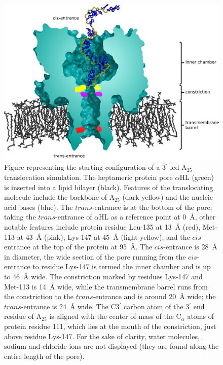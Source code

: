 \documentclass[a4paper,10pt]{article}
\newcommand{\atf}{A$_{25}$ }
\newcommand{\ahl}{$\alpha$HL }
\newcommand{\prim}{$^{\prime}$ }
\begin{document}
\begin{figure}[!h]
  \begin{center}
    \includegraphics[width=5.0in]{ahl_labelled13}
  \end{center}
  \caption{Figure representing the starting configuration of a 3\prim
led \atf translocation simulation. The heptameric protein pore \ahl
(green) is inserted into a lipid bilayer (black). Features of the
translocating molecule include the backbone of \atf (dark yellow) and
the nucleic acid bases (blue). The $trans$-entrance is at the bottom
of the pore; taking the $trans$-entrance of \ahl as a reference point
at 0~{\AA}, other notable features include protein residue Leu-135 at
13~{\AA} (red), Met-113 at 43~{\AA} (pink), Lys-147 at 45~{\AA} (light
yellow), and the $cis$-entrance at the top of the protein at
95~{\AA}. The $cis$-entrance is 28~{\AA} in diameter, the wide section
of the pore running from the $cis$-entrance to residue Lys-147 is
termed the inner chamber and is up to 46~{\AA} wide. The constriction
marked by residues Lys-147 and Met-113 is 14~{\AA} wide, while the
transmembrane barrel runs from the constriction to the
$trans$-entrance and is around 20~{\AA} wide; the $trans$-entrance is
24~{\AA} wide. The C3\prim carbon atom of the 3\prim end residue of
\atf is aligned with the center of mass of the C$_{\alpha}$ atoms of
protein residue 111, which lies at the mouth of the constriction, just
above residue Lys-147. For the sake of clarity, water molecules,
sodium and chloride ions are not displayed (they are found along the
entire length of the pore).}
  \label{fig:edge}
\end{figure} 
\end{document}
